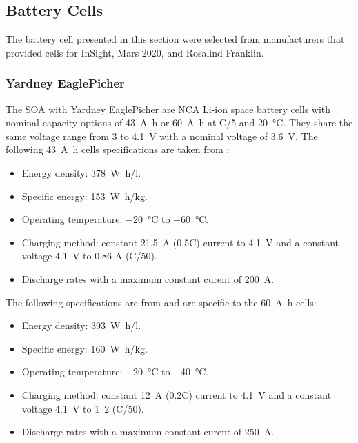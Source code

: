 \subsection{Battery Cells}
The battery cell presented in this section were selected from manufacturers that provided cells for InSight, Mars 2020, and Rosalind Franklin.

\subsubsection{Yardney EaglePicher}
The \ac{SOA} with Yardney EaglePicher are \ac{NCA} \ac{Li-ion} space battery cells with nominal capacity options of \SI{43}{\ampere\hour} or \SI{60}{\ampere\hour} at C/5 and \SI{20}{\celsius}. They share the same voltage range from 3 to \SI{4.1}{\volt} with a nominal voltage of \SI{3.6}{\volt}. The following \SI{43}{\ampere\hour} cells specifications are taken from :

\begin{itemize}
    \item Energy density: \SI{378}{\watt\hour/l}.
    \item Specific energy: \SI{153}{\watt\hour/\kilo\gram}.
    \item Operating temperature: \SI{-20}{\celsius} to +\SI{60}{\celsius}.
    \item Charging method: constant \SI{21.5}{\ampere} (0.5C) current to \SI{4.1}{\volt} and a constant voltage \SI{4.1}{\volt} to 0.86 \si{\ampere} (C/50).
    \item Discharge rates with a maximum constant curent of \SI{200}{\ampere}.
\end{itemize}

The following specifications are from  and are specific to the \SI{60}{\ampere\hour} cells:

\begin{itemize}
    \item Energy density: \SI{393}{\watt\hour/l}.
    \item Specific energy: \SI{160}{\watt\hour/\kilo\gram}.
    \item Operating temperature: \SI{-20}{\celsius} to +\SI{40}{\celsius}.
    \item Charging method: constant \SI{12}{\ampere} (0.2C) current to \SI{4.1}{\volt} and a constant voltage \SI{4.1}{\volt} to \si{1.2}{\ampere} (C/50).
    \item Discharge rates with a maximum constant curent of \SI{250}{\ampere}.
\end{itemize}

